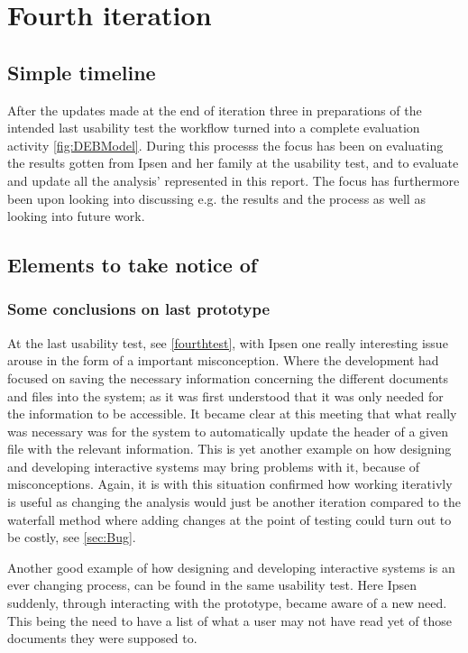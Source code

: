 \section{Fourth iteration}
\subsection{Simple timeline}\label{sec:3Iteration-timeline}
After the updates made at the end of iteration three in preparations of the intended last usability test the workflow turned into a complete evaluation activity \cref{fig:DEBModel}.
During this processs the focus has been on evaluating the results gotten from Ipsen and her family at the usability test, and to evaluate and update all the analysis' represented in this report.
The focus has furthermore been upon looking into discussing e.g. the results and the process as well as looking into future work.

\subsection{Elements to take notice of}\label{sec:4notice}
\subsubsection*{Some conclusions on last prototype}
At the last usability test, see \cref{fourthtest}, with Ipsen one really interesting issue arouse in the form of a important misconception.
Where the development had focused on saving the necessary information concerning the different documents and files into the system; as it was first understood that it was only needed for the information to be accessible.
It became clear at this meeting that what really was necessary was for the system to automatically update the header of a given file  with the relevant information.
This is yet another example on how designing and developing interactive systems may bring problems with it, because of misconceptions.
Again, it is with this situation confirmed how working iterativly is useful as changing the analysis would just be another iteration compared to the waterfall method where adding changes at the point of testing could turn out to be costly, see \cref{sec:Bug}.

Another good example of how designing and developing interactive systems is an ever changing process, can be found in the same usability test.
Here Ipsen suddenly, through interacting with the prototype, became aware of a new need.
This being the need to have a list of what a user may not have read yet of those documents they were supposed to.
